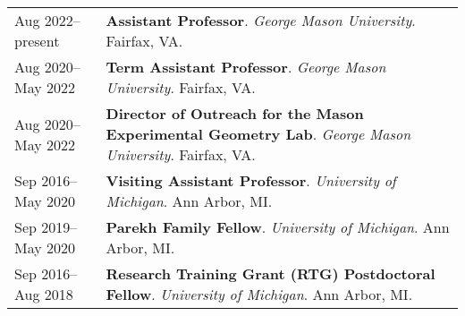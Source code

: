 
    \medskip


    \medskip
    
    \begin{center}
    {
    \renewcommand{\arraystretch}{1.5}
    \begin{longtable}{p{}  p{}}
    Aug 2022--present & \textbf{Assistant Professor}. \textit{George Mason University}.  Fairfax, VA.  \\ 
Aug 2020--May 2022 & \textbf{Term Assistant Professor}. \textit{George Mason University}.  Fairfax, VA.  \\ 
Aug 2020--May 2022 & \textbf{Director of Outreach for the Mason Experimental Geometry Lab}. \textit{George Mason University}.  Fairfax, VA.  \\ 
Sep 2016--May 2020 & \textbf{Visiting Assistant Professor}. \textit{University of Michigan}.  Ann Arbor, MI.  \\ 
Sep 2019--May 2020 & \textbf{Parekh Family Fellow}. \textit{University of Michigan}.  Ann Arbor, MI.  \\ 
Sep 2016--Aug 2018 & \textbf{Research Training Grant (RTG) Postdoctoral Fellow}. \textit{University of Michigan}.  Ann Arbor, MI.  
    \end{longtable}
    } 
    \end{center}

    \vspace{-1em}
    